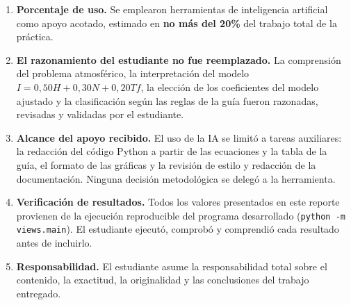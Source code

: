 \documentclass[11pt,a4paper]{article}
\begin{document}
\begin{enumerate}[leftmargin=*]
  \item \textbf{Porcentaje de uso.} Se emplearon herramientas de inteligencia artificial
        como apoyo acotado, estimado en \textbf{no m\'as del 20\%} del trabajo total de
        la pr\'actica.

  \item \textbf{El razonamiento del estudiante no fue reemplazado.} La comprensi\'on del
        problema atmosf\'erico, la interpretaci\'on del modelo
        $I = 0{,}50H + 0{,}30N + 0{,}20Tf$, la elecci\'on de los coeficientes del modelo
        ajustado y la clasificaci\'on seg\'un las reglas de la gu\'ia fueron razonadas,
        revisadas y validadas por el estudiante.

  \item \textbf{Alcance del apoyo recibido.} El uso de la IA se limit\'o a tareas
        auxiliares: la redacci\'on del c\'odigo Python a partir de las ecuaciones y la
        tabla de la gu\'ia, el formato de las gr\'aficas y la revisi\'on de estilo y
        redacci\'on de la documentaci\'on. Ninguna decisi\'on metodol\'ogica se deleg\'o a
        la herramienta.

  \item \textbf{Verificaci\'on de resultados.} Todos los valores presentados en este
        reporte provienen de la ejecuci\'on reproducible del programa desarrollado
        (\texttt{python -m views.main}). El estudiante ejecut\'o, comprob\'o y
        comprendi\'o cada resultado antes de incluirlo.

  \item \textbf{Responsabilidad.} El estudiante asume la responsabilidad total sobre el
        contenido, la exactitud, la originalidad y las conclusiones del trabajo entregado.
\end{enumerate}



\end{document}
